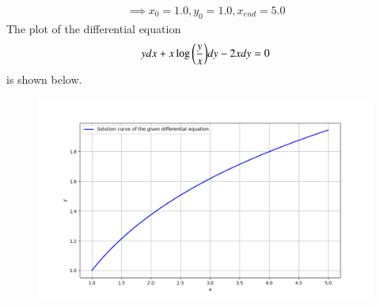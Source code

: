 \documentclass[journal]{IEEEtran}
\begin{document}
\begin{enumerate}
\begin{align*}
    \implies x_0 = 1.0, y_0 = 1.0, x_{end} = 5.0
\end{align*}
The plot of the differential equation 
\begin{align*}
    y dx + x \log{\ensuremath{\left(\frac{y}{x}\right)}} dy - 2x dy = 0
\end{align*}
is shown below.
\begin{figure}[H]
    \centering
    \includegraphics[width = \columnwidth]{figs/fig.png}
\end{figure}
\end{enumerate}
\end{document}
